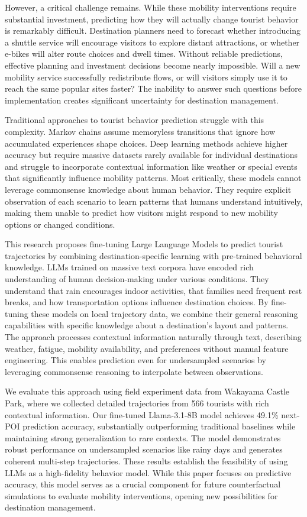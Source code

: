\documentclass[letterpaper]{article}
\begin{document}
However, a critical challenge remains. While these mobility interventions require substantial investment, predicting how they will actually change tourist behavior is remarkably difficult. Destination planners need to forecast whether introducing a shuttle service will encourage visitors to explore distant attractions, or whether e-bikes will alter route choices and dwell times. Without reliable predictions, effective planning and investment decisions become nearly impossible. Will a new mobility service successfully redistribute flows, or will visitors simply use it to reach the same popular sites faster? The inability to answer such questions before implementation creates significant uncertainty for destination management.

Traditional approaches to tourist behavior prediction struggle with this complexity. Markov chains assume memoryless transitions that ignore how accumulated experiences shape choices. Deep learning methods achieve higher accuracy but require massive datasets rarely available for individual destinations and struggle to incorporate contextual information like weather or special events that significantly influence mobility patterns. Most critically, these models cannot leverage commonsense knowledge about human behavior. They require explicit observation of each scenario to learn patterns that humans understand intuitively, making them unable to predict how visitors might respond to new mobility options or changed conditions.

This research proposes fine-tuning Large Language Models to predict tourist trajectories by combining destination-specific learning with pre-trained behavioral knowledge. LLMs trained on massive text corpora have encoded rich understanding of human decision-making under various conditions. They understand that rain encourages indoor activities, that families need frequent rest breaks, and how transportation options influence destination choices. By fine-tuning these models on local trajectory data, we combine their general reasoning capabilities with specific knowledge about a destination's layout and patterns. The approach processes contextual information naturally through text, describing weather, fatigue, mobility availability, and preferences without manual feature engineering. This enables prediction even for undersampled scenarios by leveraging commonsense reasoning to interpolate between observations.

We evaluate this approach using field experiment data from Wakayama Castle Park, where we collected detailed trajectories from 566 tourists with rich contextual information. Our fine-tuned Llama-3.1-8B model achieves 49.1\% next-POI prediction accuracy, substantially outperforming traditional baselines while maintaining strong generalization to rare contexts. The model demonstrates robust performance on undersampled scenarios like rainy days and generates coherent multi-step trajectories. These results establish the feasibility of using LLMs as a high-fidelity behavior model. While this paper focuses on predictive accuracy, this model serves as a crucial component for future counterfactual simulations to evaluate mobility interventions, opening new possibilities for destination management.
\end{document}
